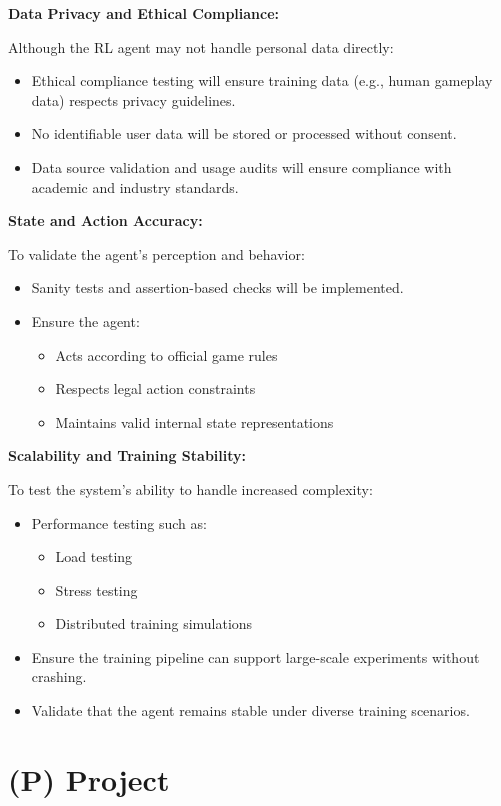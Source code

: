 \documentclass{article}
\begin{document}
\noindent\textbf{Data Privacy and Ethical Compliance:}

Although the RL agent may not handle personal data directly:
\begin{itemize}
    \item Ethical compliance testing will ensure training data (e.g., human gameplay data) respects privacy guidelines.
    \item No identifiable user data will be stored or processed without consent.
    \item Data source validation and usage audits will ensure compliance with academic and industry standards.
\end{itemize}

\noindent\textbf{State and Action Accuracy:}

To validate the agent’s perception and behavior:
\begin{itemize}
    \item Sanity tests and assertion-based checks will be implemented.
    \item Ensure the agent:
    \begin{itemize}
        \item Acts according to official game rules
        \item Respects legal action constraints
        \item Maintains valid internal state representations
    \end{itemize}
\end{itemize}

\noindent\textbf{Scalability and Training Stability:}

To test the system’s ability to handle increased complexity:
\begin{itemize}
    \item Performance testing such as:
    \begin{itemize}
        \item Load testing
        \item Stress testing
        \item Distributed training simulations
    \end{itemize}
    \item Ensure the training pipeline can support large-scale experiments without crashing.
    \item Validate that the agent remains stable under diverse training scenarios.
\end{itemize}
\newpage{}


\section*{(P) Project}\label{sec:srs_project}
\renewcommand{\thesubsection}{P.\arabic{subsection}}
\setcounter{subsection}{0}
\end{document}
